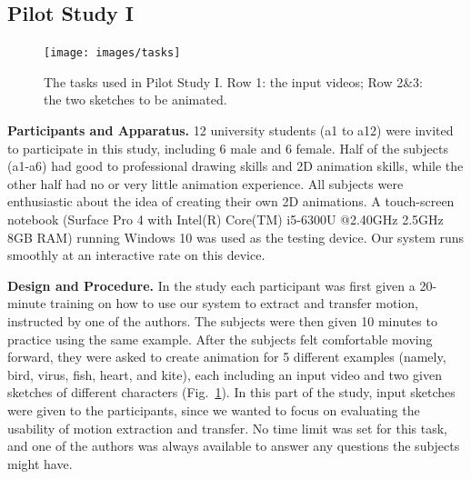 \subsection{Pilot Study I}
\begin{figure}
	\centering
	\texttt{[image: images/tasks]}
	\caption{The tasks used in Pilot Study I. Row 1: the input videos; Row 2\&3: the two sketches to be animated.}
	\label{fig:tasks}
\end{figure}

{\bf Participants and Apparatus.}  12 university students (a1 to a12) were invited to participate in this study, including {6} male and {6} female. %
Half of the subjects (a1-a6) had good to professional drawing skills and 2D animation skills, while the other half had no or very little animation experience. All subjects were enthusiastic about the idea of creating their own 2D animations. 
%
A touch-screen notebook (Surface Pro 4 with Intel(R) Core(TM) i5-6300U @2.40GHz 2.5GHz 8GB RAM) running Windows 10 was used as the testing device. Our system runs smoothly at an interactive rate on this device.

{\bf Design and Procedure.} In the study each participant was first given a 20-minute training on how to use our system to extract and transfer motion, instructed by one of the authors.
The subjects were then given 10 minutes to practice using the same example. 
After the subjects felt comfortable moving forward, they were asked to create animation for 5 different examples {(namely, bird, virus, fish, heart, and kite)}, each including an input video and two given sketches of different characters (Fig.~\ref{fig:tasks}). In this part of the study, input sketches were given to the participants, since we wanted to focus on evaluating the usability of motion extraction and transfer. No time limit was set for this task, and one of the authors was always available to answer any questions the subjects might have. 


